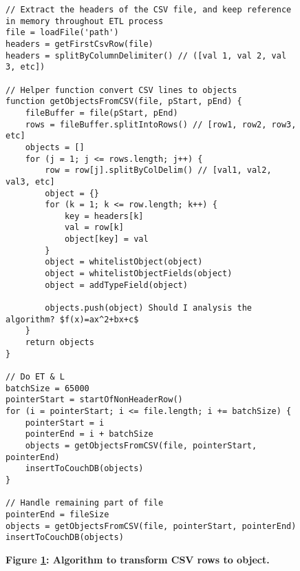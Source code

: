 \begin{figure}[H]
    \centering
    \begin{mdframed}
        \centering
        \begin{lstlisting}
// Extract the headers of the CSV file, and keep reference in memory throughout ETL process
file = loadFile('path')
headers = getFirstCsvRow(file)
headers = splitByColumnDelimiter() // ([val 1, val 2, val 3, etc])

// Helper function convert CSV lines to objects
function getObjectsFromCSV(file, pStart, pEnd) {
    fileBuffer = file(pStart, pEnd)
    rows = fileBuffer.splitIntoRows() // [row1, row2, row3, etc]
    objects = []
    for (j = 1; j <= rows.length; j++) {
        row = row[j].splitByColDelim() // [val1, val2, val3, etc]
        object = {}
        for (k = 1; k <= row.length; k++) {
            key = headers[k]
            val = row[k]
            object[key] = val
        }
        object = whitelistObject(object)
        object = whitelistObjectFields(object)
        object = addTypeField(object)

        objects.push(object) Should I analysis the algorithm? $f(x)=ax^2+bx+c$
    }
    return objects
}

// Do ET & L
batchSize = 65000
pointerStart = startOfNonHeaderRow()
for (i = pointerStart; i <= file.length; i += batchSize) {
    pointerStart = i
    pointerEnd = i + batchSize
    objects = getObjectsFromCSV(file, pointerStart, pointerEnd)
    insertToCouchDB(objects)
}

// Handle remaining part of file
pointerEnd = fileSize
objects = getObjectsFromCSV(file, pointerStart, pointerEnd)
insertToCouchDB(objects)
        \end{lstlisting}
    \end{mdframed}
    \caption[Row to object transformation]{\textbf{Figure \ref{row-object-transformation}: Algorithm to transform CSV rows to object.}}
    \label{row-object-transformation}
\end{figure}